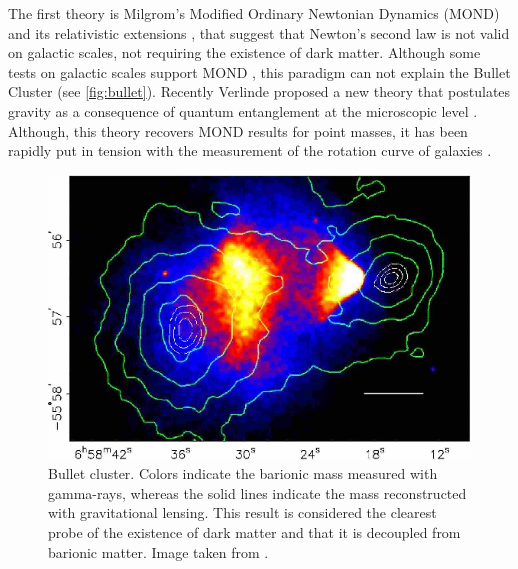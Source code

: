 The first theory is Milgrom's Modified Ordinary Newtonian Dynamics (MOND)  and its relativistic extensions \cite{1983ApJ...270..365M,1984ApJ...286....7B,1997ApJ...480..492S,1994ApJ...429..480B}, that suggest that Newton's second law is not valid on galactic scales, not requiring the existence of dark matter. Although some tests on galactic scales support MOND \cite{2011PhRvL.106l1303M,2013PhRvL.111d1105M}, this paradigm can not explain the Bullet Cluster \cite{2006ApJ...648L.109C,2006ApJ...652..937B,2007MNRAS.382...29B} (see \autoref{fig:bullet}). Recently Verlinde proposed a new theory that postulates gravity as a consequence of quantum entanglement at the microscopic level \cite{2016arXiv161102269V}. Although, this theory recovers MOND results for point masses, it has been rapidly put in tension with the measurement of the rotation curve of galaxies \cite{2017MNRAS.468L..68L}.
\begin{figure}
\includegraphics[width=\textwidth]{./Pictures/bullet_cluster.png}
\caption{Bullet cluster. Colors indicate the barionic mass measured with gamma-rays, whereas the solid lines indicate the mass reconstructed with gravitational lensing. This result is considered the clearest probe of the existence of dark matter and that it is decoupled from barionic matter. Image taken from \cite{2008PhRvD..78j4004D}.}
\label{fig:bullet}
\end{figure}
\newline

